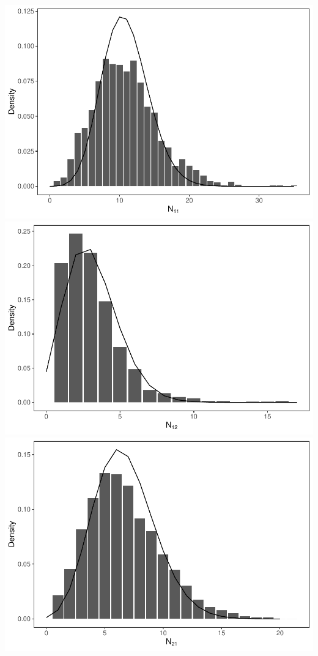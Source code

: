 \documentclass[]{article}
\begin{document}
\includegraphics{Projekt1_files/figure-latex/unnamed-chunk-4-1.pdf}
\includegraphics{Projekt1_files/figure-latex/unnamed-chunk-4-2.pdf}
\includegraphics{Projekt1_files/figure-latex/unnamed-chunk-4-3.pdf}
\end{document}
